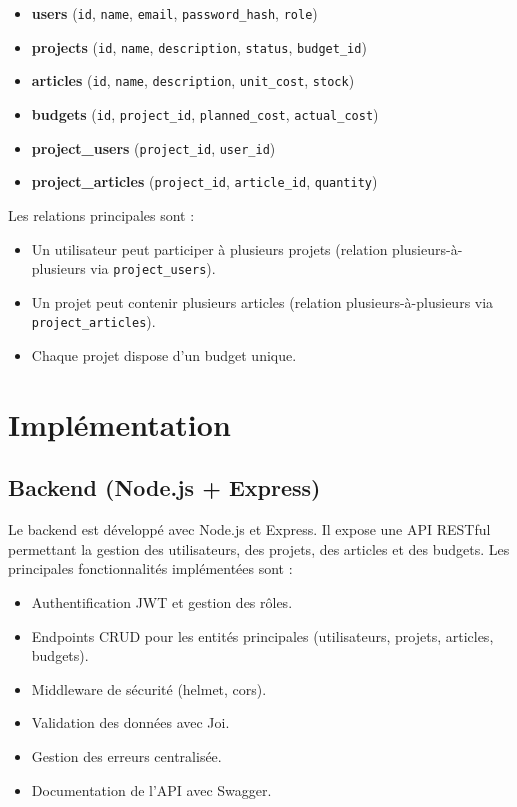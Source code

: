 \documentclass[12pt,a4paper]{report}
\begin{document}
\begin{itemize}
    \item \textbf{users} (\texttt{id}, \texttt{name}, \texttt{email}, \texttt{password\_hash}, \texttt{role})
    \item \textbf{projects} (\texttt{id}, \texttt{name}, \texttt{description}, \texttt{status}, \texttt{budget\_id})
    \item \textbf{articles} (\texttt{id}, \texttt{name}, \texttt{description}, \texttt{unit\_cost}, \texttt{stock})
    \item \textbf{budgets} (\texttt{id}, \texttt{project\_id}, \texttt{planned\_cost}, \texttt{actual\_cost})
    \item \textbf{project\_users} (\texttt{project\_id}, \texttt{user\_id})
    \item \textbf{project\_articles} (\texttt{project\_id}, \texttt{article\_id}, \texttt{quantity})
\end{itemize}

Les relations principales sont :
\begin{itemize}
    \item Un utilisateur peut participer à plusieurs projets (relation plusieurs-à-plusieurs via \texttt{project\_users}).
    \item Un projet peut contenir plusieurs articles (relation plusieurs-à-plusieurs via \texttt{project\_articles}).
    \item Chaque projet dispose d’un budget unique.
\end{itemize}

\chapter{Implémentation}
\section{Backend (Node.js + Express)}

Le backend est développé avec Node.js et Express. Il expose une API RESTful permettant la gestion des utilisateurs, des projets, des articles et des budgets. Les principales fonctionnalités implémentées sont :
\begin{itemize}
    \item Authentification JWT et gestion des rôles.
    \item Endpoints CRUD pour les entités principales (utilisateurs, projets, articles, budgets).
    \item Middleware de sécurité (helmet, cors).
    \item Validation des données avec Joi.
    \item Gestion des erreurs centralisée.
    \item Documentation de l’API avec Swagger.
\end{itemize}
\end{document}

